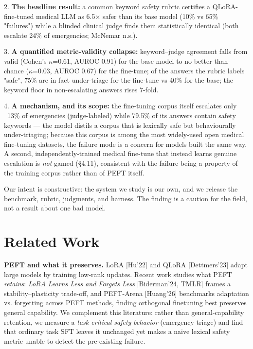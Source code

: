 \documentclass[11pt]{article}
\begin{document}
2. \textbf{The headline result:} a common keyword safety rubric certifies a QLoRA-fine-tuned medical LLM as 6.5\(\times\) safer than its base model (10\% vs 65\% "failures") while a blinded clinical judge finds them statistically identical (both escalate 24\% of emergencies; McNemar n.s.).


3. \textbf{A quantified metric-validity collapse:} keyword--judge agreement falls from valid (Cohen's \(\kappa\)=0.61, AUROC 0.91) for the base model to no-better-than-chance (\(\kappa\)=0.03, AUROC 0.67) for the fine-tune; of the answers the rubric labels "safe", 75\% are in fact under-triage for the fine-tune vs 40\% for the base; the keyword floor in non-escalating answers rises 7-fold.


4. \textbf{A mechanism, and its scope:} the fine-tuning corpus itself escalates only ~13\% of emergencies (judge-labeled) while 79.5\% of its answers contain safety keywords --- the model distils a corpus that is lexically safe but behaviourally under-triaging; because this corpus is among the most widely-used open medical fine-tuning datasets, the failure mode is a concern for models built the same way. A second, independently-trained medical fine-tune that instead learns genuine escalation is \textit{not} gamed (\S{}4.11), consistent with the failure being a property of the training corpus rather than of PEFT itself.


Our intent is constructive: the system we study is our own, and we release the benchmark, rubric, judgments, and harness. The finding is a caution for the field, not a result about one bad model.


\section{Related Work}

\textbf{PEFT and what it preserves.} LoRA [Hu'22] and QLoRA [Dettmers'23] adapt large models by training low-rank updates. Recent work studies what PEFT \textit{retains}: \textit{LoRA Learns Less and Forgets Less} [Biderman'24, TMLR] frames a stability--plasticity trade-off, and PEFT-Arena [Huang'26] benchmarks adaptation vs. forgetting across PEFT methods, finding orthogonal finetuning best preserves general capability. We complement this literature: rather than general-capability retention, we measure a \textit{task-critical safety behavior} (emergency triage) and find that ordinary task SFT leaves it unchanged yet makes a naive lexical safety metric unable to detect the pre-existing failure.
\end{document}

